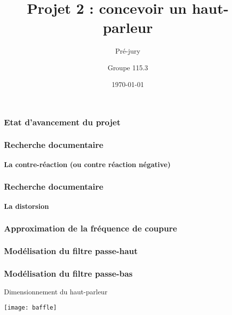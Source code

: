 \documentclass[pdf]{beamer}
\title{Projet 2 : concevoir un haut-parleur}
\subtitle{Pré-jury}
\author{Groupe 115.3}
\date{\today}
\begin{document}
\begin{frame}
	\titlepage
\end{frame}

\begin{frame}
	\frametitle{Etat d'avancement du projet}	
\end{frame}

\begin{frame}
	\frametitle{Recherche documentaire}
	\framesubtitle{La contre-réaction (ou contre réaction négative)}
	
	
	
\end{frame}

\begin{frame}
	\frametitle{Recherche documentaire}
	\framesubtitle{La distorsion}
\end{frame}
	
\begin{frame}
	\frametitle{Approximation de la fréquence de coupure}
\end{frame}

\begin{frame}
	\frametitle{Modélisation du filtre passe-haut}
\end{frame}

\begin{frame}
	\frametitle{Modélisation du filtre passe-bas}
\end{frame}

\begin{frame}{Dimensionnement du haut-parleur}

\begin{center}
\texttt{[image: baffle]}
\end{center}

\end{frame}
\end{document}
